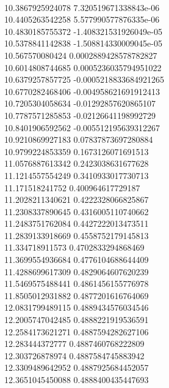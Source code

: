 { \\
10.3867925924078 7.320519671338843e-06
 \\
10.4405263542258 5.577990577876335e-06
 \\
10.4830185755372 -1.408321531926049e-05
 \\
10.5378841142838 -1.508814330009045e-05
 \\
10.567570080424 0.0002889428578782827
 \\
10.6014808744685 0.0005236035794951022
 \\
10.6379257857725 -0.0005218833684921265
 \\
10.6770282468406 -0.004958621691912413
 \\
10.7205304058634 -0.01292857620865107
 \\
10.7787571285853 -0.02126641198992729
 \\
10.8401906592562 -0.005512195639312267
 \\
10.9210869927183 0.07837873697280884
 \\
10.9799224853359 0.1673126071691513
 \\
11.0576887613342 0.2423038631677628
 \\
11.1214557554249 0.3410933017730713
 \\
11.171518241752 0.400964617729187
 \\
11.2028211340621 0.4222328066825867
 \\
11.2308337890645 0.4316005110740662
 \\
11.2483751762084 0.4427222013473511
 \\
11.2839133918669 0.4558752179145813
 \\
11.334718911573 0.4702833294868469
 \\
11.3699554936684 0.4776104688644409
 \\
11.4288699617309 0.4829064607620239
 \\
11.5469575488441 0.4861456155776978
 \\
11.8505012931882 0.4877201616764069
 \\
12.0831799489115 0.4889434576034546
 \\
12.2005747042485 0.4888221919536591
 \\
12.2584173621271 0.4887594282627106
 \\
12.283444372777 0.4887460768222809
 \\
12.303726878974 0.4887584745883942
 \\
12.3309489642952 0.4887925684452057
 \\
12.3651045450088 0.4888400435447693
 \\
}
